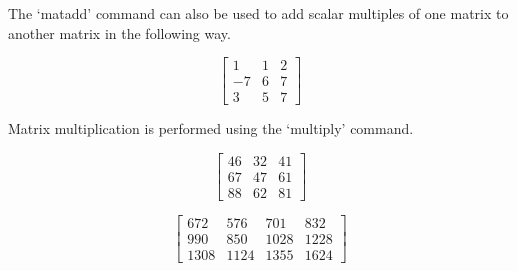 The `matadd' command can also be used to add scalar multiples of
one matrix to another matrix in the following way.
\bigskip

\begin{maplegroup}
\begin{mapleinput}
\end{mapleinput}

\mapleresult
\begin{maplelatex}
\[
 \left[
{\begin{array}{rrr} 1 & 1 & 2 \\ -7 & 6 & 7 \\ 3 & 5 & 7
\end{array}}
 \right]
\]
\end{maplelatex}

\end{maplegroup}
\begin{maplegroup}
Matrix multiplication is performed using the `multiply' command.

\end{maplegroup}
\begin{maplegroup}
\begin{mapleinput}
\end{mapleinput}

\mapleresult
\begin{maplelatex}
\[
 \left[
{\begin{array}{rrr} 46 & 32 & 41 \\ 67 & 47 & 61 \\ 88 & 62 & 81
\end{array}}
 \right]
\]
\end{maplelatex}

\end{maplegroup}
\begin{maplegroup}
\begin{mapleinput}
\end{mapleinput}

\mapleresult
\begin{maplelatex}
\[
 \left[
{\begin{array}{rrrr} 672 & 576 & 701 & 832 \\ 990 & 850 & 1028 &
1228 \\ 1308 & 1124 & 1355 & 1624
\end{array}}
 \right]
\]
\end{maplelatex}

\end{maplegroup}
\bigskip

